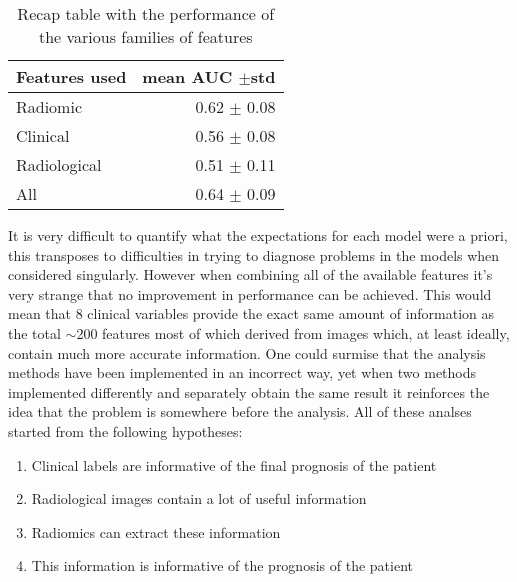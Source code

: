 \begin{table}
\caption{Recap table with the performance of the various families of features \label{tab:RecapicuRF}}
\centering
\begin{tabular}{l|r}
\toprule
Features used & mean AUC $\pm$std\\
\midrule
Radiomic  & 0.62 $\pm$ 0.08\\
Clinical  &  0.56 $\pm$ 0.08\\
Radiological & 0.51 $\pm$ 0.11\\
All & 0.64 $\pm$ 0.09\\
\bottomrule
\end{tabular}
\end{table}

It is very difficult to quantify what the expectations for each model were a priori, this transposes to difficulties in trying to diagnose problems in the models when considered singularly. However when combining all of the available features it's very strange that no improvement in performance can be achieved. This would mean that 8 clinical variables provide the exact same amount of information as the total $\sim$200 features most of which derived from images which, at least ideally, contain much more accurate information. 
One could surmise that the analysis methods have been implemented in an incorrect way, yet when two methods implemented differently and separately obtain the same result it reinforces the idea that the problem is somewhere before the analysis. All of these analses started from the following hypotheses:

\begin{enumerate}
\item Clinical labels are informative of the final prognosis of the patient
\item Radiological images contain a lot of useful information
\item Radiomics can extract these information
\item This information is informative of the prognosis of the patient
\end{enumerate}

